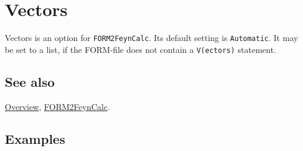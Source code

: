 \documentclass[../FeynCalcManual.tex]{subfiles}
\begin{document}
\hypertarget{vectors}{
\section{Vectors}\label{vectors}}

Vectors is an option for \texttt{FORM2FeynCalc}. Its default setting is
\texttt{Automatic}. It may be set to a list, if the FORM-file does not
contain a \texttt{V(ectors)} statement.

\subsection{See also}

\hyperlink{toc}{Overview}, \hyperlink{form2feyncalc}{FORM2FeynCalc}.

\subsection{Examples}
\end{document}
